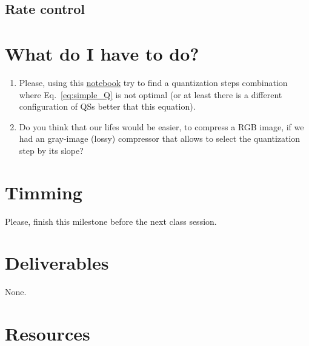 
\subsection{Rate control}



\section{What do I have to do?}

\begin{enumerate}
\item Please, using this
  \href{https://github.com/Sistemas-Multimedia/Sistemas-Multimedia.github.io/blob/master/milestones/05-RGB_compression/RGB_compression.ipynb}{notebook}
  try to find a quantization steps combination where
  Eq.~\ref{eq:simple_Q} is not optimal (or at least there is a
  different configuration of QSs better that this equation).
\item Do you think that our lifes would be easier, to compress a RGB
  image, if we had an gray-image (lossy) compressor that allows to
  select the quantization step by its slope?
\end{enumerate}


\section{Timming}

Please, finish this milestone before the next class session.

\section{Deliverables}

None.

\section{Resources}

\renewcommand{\addcontentsline}[3]{} %

